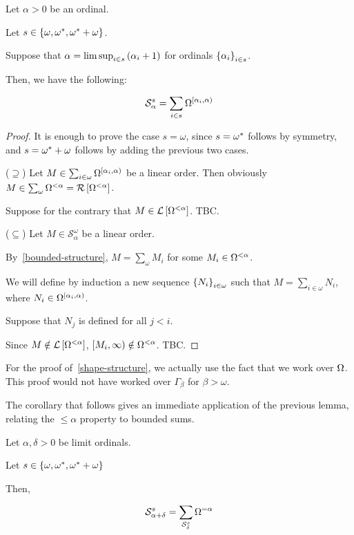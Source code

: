 \begin{lemma}\label{shape-structure}
  Let $\alpha > 0$ be an ordinal.

  Let $s \in \left\{ {\omega, \omega^\ast, \omega^\ast + \omega} \right\}$.

  Suppose that
  $\alpha = \limsup_{i \in s} \left( {\alpha_i + 1} \right)$ for
  ordinals $\left\{ {\alpha_i} \right\}_{i \in s}$.

  Then, we have the following:

  \[
    \mathcal{S}^{s}_{\alpha} = \sum_{i \in s}{\Omega^{[\alpha_i, \alpha)}}
  \]
\end{lemma}

\begin{proof}
  It is enough to prove the case $s = \omega$,
  since $s = \omega^\ast$ follows by symmetry,
  and $s = \omega^\ast + \omega$ follows by adding the previous two cases.

  ($\supseteq$) Let $M \in \sum_{i \in \omega}{\Omega^{[\alpha_i, \alpha)}}$ be a linear order.
  Then obviously $M \in \sum_{\omega}{\Omega^{< \alpha}} = \mathcal{R} \left[ {{\Omega^{< \alpha}}} \right]$.

  Suppose for the contrary that $M \in \mathcal{L} \left[ {{\Omega^{< \alpha}}} \right]$.
  TBC.

  ($\subseteq$) Let $M \in \mathcal{S}^{\omega}_{\alpha}$ be a linear order.

  By~\cref{bounded-structure}, $M = \sum_{\omega}{M_i}$ for some $M_i \in \Omega^{< \alpha}$.

  We will define by induction a new sequence $\left\{ {N_i} \right\}_{i \in \omega}$ such that $M = \sum_{i \in \omega} N_i$,
  where $N_i \in \Omega^{[\alpha_i, \alpha)}$.

  Suppose that $N_j$ is defined for all $j < i$.

  Since $M \notin \mathcal{L} \left[ {{\Omega^{< \alpha}}} \right]$, $[M_i, \infty) \notin \Omega^{< \alpha}$.
  TBC.
\end{proof}

\begin{note}
  For the proof of~\cref{shape-structure}, we actually use the fact that
  we work over $\Omega$. This proof would not have worked over $\Gamma_{\beta}$
  for $\beta > \omega$.
\end{note}

The corollary that follows gives an immediate application of the previous lemma, relating the $\le \alpha$ property to
bounded sums.

\begin{corollary}
  Let $\alpha, \delta > 0$ be limit ordinals.

  Let $s \in \left\{ {\omega, \omega^\ast, \omega^\ast + \omega} \right\}$

  Then,

  \[
    \mathcal{S}^{s}_{\alpha + \delta}
    = \sum_{\mathcal{S}^{s}_{\delta}}{\Omega^{= \alpha}}
  \]
\end{corollary}

